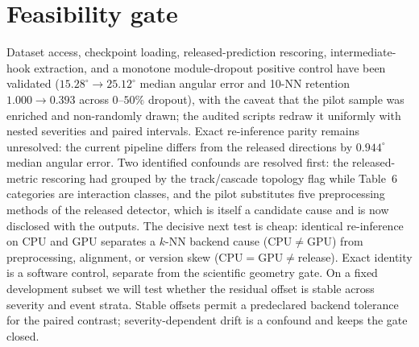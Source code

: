 \documentclass[10pt,twocolumn]{extarticle}
\begin{document}
\section{Feasibility gate}

Dataset access, checkpoint loading, released-prediction rescoring,
intermediate-hook extraction, and a monotone module-dropout positive control
have been validated ($15.28^\circ\!\to\!25.12^\circ$ median angular error and
10-NN retention $1.000\!\to\!0.393$ across $0$--$50\%$ dropout), with the
caveat that the pilot sample was enriched and non-randomly drawn; the audited
scripts redraw it uniformly with nested severities and paired intervals.
Exact re-inference parity remains unresolved: the current pipeline differs
from the released directions by $0.944^\circ$ median angular error. Two
identified confounds are resolved first: the released-metric rescoring had
grouped by the track/cascade topology flag while Table~6 categories are
interaction classes, and the pilot substitutes five preprocessing methods of
the released detector, which is itself a candidate cause and is now disclosed
with the outputs. The decisive next test is cheap: identical re-inference on
CPU and GPU separates a $k$-NN backend cause (CPU$\neq$GPU) from
preprocessing, alignment, or version skew (CPU$=$GPU$\neq$release). Exact
identity is a software control, separate from the scientific geometry gate. On
a fixed development subset we will test whether the residual offset is stable
across severity and event strata. Stable offsets permit a predeclared backend
tolerance for the paired contrast; severity-dependent drift is a confound and
keeps the gate closed.
\end{document}
